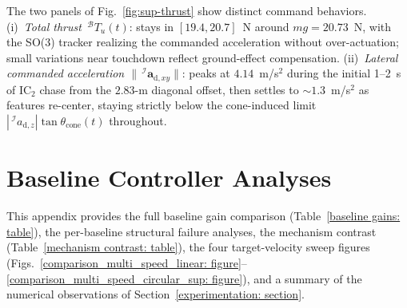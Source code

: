 \documentclass{IEEEtaes}
\begin{document}
The two panels of Fig.~\ref{fig:sup-thrust} show distinct command behaviors. (i)~\emph{Total thrust $\,^\mathcal{B}T_u(t)$}: stays in $[19.4, 20.7]$~N around $mg=20.73$~N, with the SO(3) tracker realizing the commanded acceleration without over-actuation; small variations near touchdown reflect ground-effect compensation. (ii)~\emph{Lateral commanded acceleration $\|\,^\mathcal{I}\boldsymbol{a}_{\text{d},xy}\|$}: peaks at $4.14$~m/s$^2$ during the initial 1--2~s of IC$_2$ chase from the $2.83$-m diagonal offset, then settles to $\sim 1.3$~m/s$^2$ as features re-center, staying strictly below the cone-induced limit $|\,^\mathcal{I}a_{\text{d},z}|\tan\theta_\text{cone}(t)$ throughout.


\section{Baseline Controller Analyses} \label{baseline analyses appendix: section}
This appendix provides the full baseline gain comparison (Table~\ref{baseline gains: table}), the per-baseline structural failure analyses, the mechanism contrast (Table~\ref{mechanism contrast: table}), the four target-velocity sweep figures (Figs.~\ref{comparison_multi_speed_linear: figure}--\ref{comparison_multi_speed_circular_sup: figure}), and a summary of the numerical observations of Section~\ref{experimentation: section}.
\end{document}
